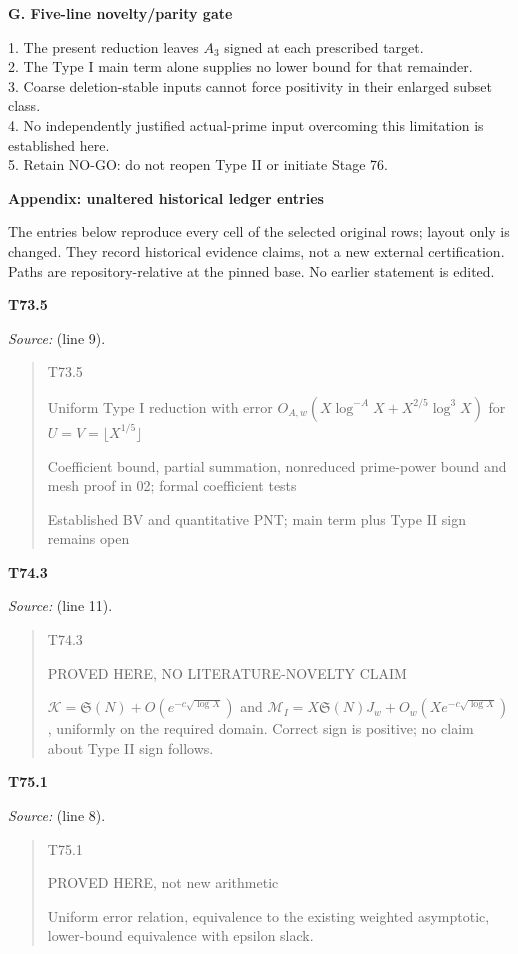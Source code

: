 \documentclass[10pt,a4paper]{article}
\newcommand{\head}[1]{\smallskip\textbf{#1}\par}
\begin{document}
\head{G. Five-line novelty/parity gate}
1. The present reduction leaves $A_3$ signed at each prescribed target.\\
2. The Type I main term alone supplies no lower bound for that remainder.\\
3. Coarse deletion-stable inputs cannot force positivity in their enlarged subset class.\\
4. No independently justified actual-prime input overcoming this limitation is established here.\\
5. Retain NO-GO: do not reopen Type II or initiate Stage 76.
\newpage
\begin{center}\large\textbf{Appendix: unaltered historical ledger entries}\end{center}
\small The entries below reproduce every cell of the selected original rows; layout only is changed. They record historical evidence claims, not a new external certification. Paths are repository-relative at the pinned base. No earlier statement is edited.

\head{T73.5}\textit{Source:}  (line 9).
\begin{quote}
T73.5

Uniform Type I reduction with error $O_{A,w}(X\log^{-A}X+X^{2/5}\log^3X)$ for $U=V=\lfloor X^{1/5}\rfloor$

Coefficient bound, partial summation, nonreduced prime-power bound and mesh proof in 02; formal coefficient tests

Established BV and quantitative PNT; main term plus Type II sign remains open
\end{quote}

\head{T74.3}\textit{Source:}  (line 11).
\begin{quote}
T74.3

PROVED HERE, NO LITERATURE-NOVELTY CLAIM

$\mathcal K=\mathfrak S(N)+O(e^{-c\sqrt{\log X}})$ and $\mathcal M_I=X\mathfrak S(N)J_w+O_w(Xe^{-c\sqrt{\log X}})$, uniformly on the required domain. Correct sign is positive; no claim about Type II sign follows.
\end{quote}

\head{T75.1}\textit{Source:}  (line 8).
\begin{quote}
T75.1

PROVED HERE, not new arithmetic

Uniform error relation, equivalence to the existing weighted asymptotic, lower-bound equivalence with epsilon slack.
\end{quote}
\end{document}

